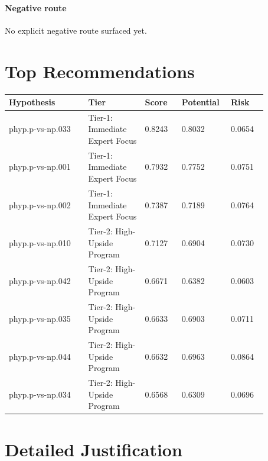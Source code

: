 \documentclass[11pt]{article}
\begin{document}
\paragraph{Negative route}
No explicit negative route surfaced yet.
\section*{Top Recommendations}
\begin{longtable}{p{0.28\linewidth}p{0.20\linewidth}p{0.13\linewidth}p{0.13\linewidth}p{0.13\linewidth}}
\toprule
Hypothesis & Tier & Score & Potential & Risk \\
\midrule
\endhead
phyp.p-vs-np.033 & Tier-1: Immediate Expert Focus & 0.8243 & 0.8032 & 0.0654 \\
phyp.p-vs-np.001 & Tier-1: Immediate Expert Focus & 0.7932 & 0.7752 & 0.0751 \\
phyp.p-vs-np.002 & Tier-1: Immediate Expert Focus & 0.7387 & 0.7189 & 0.0764 \\
phyp.p-vs-np.010 & Tier-2: High-Upside Program & 0.7127 & 0.6904 & 0.0730 \\
phyp.p-vs-np.042 & Tier-2: High-Upside Program & 0.6671 & 0.6382 & 0.0603 \\
phyp.p-vs-np.035 & Tier-2: High-Upside Program & 0.6633 & 0.6903 & 0.0711 \\
phyp.p-vs-np.044 & Tier-2: High-Upside Program & 0.6632 & 0.6963 & 0.0864 \\
phyp.p-vs-np.034 & Tier-2: High-Upside Program & 0.6568 & 0.6309 & 0.0696 \\
\bottomrule
\end{longtable}
\section*{Detailed Justification}
\end{document}
